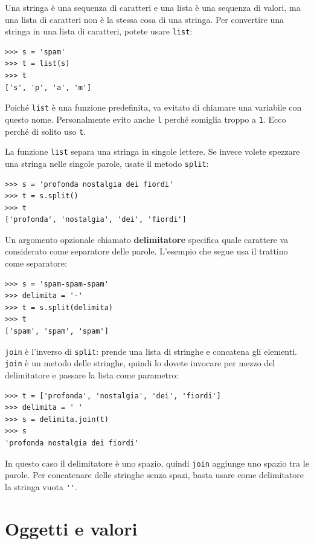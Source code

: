 \documentclass[10pt]{book}
\begin{document}
Una stringa è una sequenza di caratteri e una lista è una sequenza di valori, ma una lista di caratteri non è la stessa cosa di una stringa. Per convertire una stringa in una lista di caratteri, potete usare {\tt list}:

\begin{verbatim}
>>> s = 'spam'
>>> t = list(s)
>>> t
['s', 'p', 'a', 'm']
\end{verbatim}
%
Poiché {\tt list} è una funzione predefinita, va evitato di chiamare una variabile con questo nome. Personalmente evito anche {\tt l} perché somiglia troppo a {\tt 1}.  Ecco perché di solito uso {\tt t}.

La funzione {\tt list} separa una stringa in singole lettere. Se invece volete spezzare una stringa nelle singole parole, usate il metodo {\tt split}:

\begin{verbatim}
>>> s = 'profonda nostalgia dei fiordi'
>>> t = s.split()
>>> t
['profonda', 'nostalgia', 'dei', 'fiordi']
\end{verbatim}
%
Un argomento opzionale chiamato {\bf delimitatore} specifica quale carattere va considerato come separatore delle parole. L'esempio che segue usa il trattino come separatore:

\begin{verbatim}
>>> s = 'spam-spam-spam'
>>> delimita = '-'
>>> t = s.split(delimita)
>>> t
['spam', 'spam', 'spam']
\end{verbatim}
%
{\tt join} è l'inverso di {\tt split}: prende una lista di stringhe e concatena gli elementi.  {\tt join} è un metodo delle stringhe, quindi lo dovete invocare per mezzo del delimitatore e passare la lista come parametro:

\begin{verbatim}
>>> t = ['profonda', 'nostalgia', 'dei', 'fiordi']
>>> delimita = ' '
>>> s = delimita.join(t)
>>> s
'profonda nostalgia dei fiordi'
\end{verbatim}
%
In questo caso il delimitatore è uno spazio, quindi
{\tt join} aggiunge uno spazio tra le parole. Per concatenare delle stringhe senza spazi, basta usare come delimitatore la stringa vuota \verb"''".


\section{Oggetti e valori}
\label{equivalence}
\end{document}

